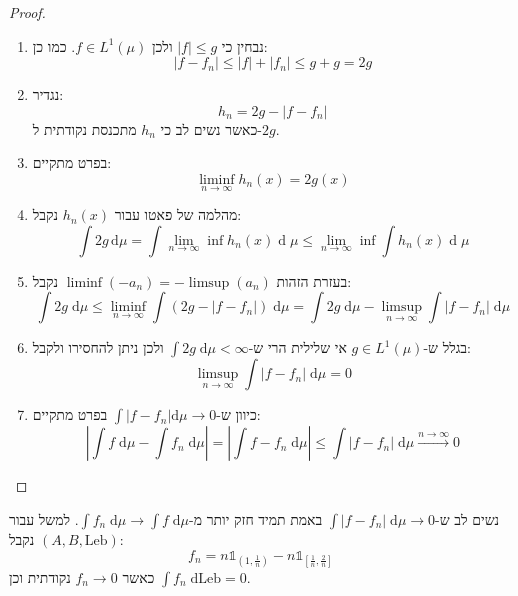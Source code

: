 \documentclass{tstextbook}
\begin{document}
\begin{proof}
  \begin{enumerate}
    \item נבחין כי \(\lvert f \rvert\leq g\) ולכן \(f \in L^{1}\left( \mu \right)\). כמו כן: 
$$\lvert f-f_{n} \rvert \leq \lvert f \rvert +\lvert f_{n} \rvert \leq g+g = 2g$$


    \item נגדיר: 
$$h_{n}=2g-\lvert f-f_{n} \rvert $$
כאשר נשים לב כי \(h_{n}\) מתכנסת נקודתית ל-\(2g\).


    \item בפרט מתקיים: 
$$\liminf_{ n \to \infty } h_{n}(x)=2g(x) $$


    \item מהלמה של פאטו עבור \(h_{n}(x)\) נקבל: 
$$\int2g\,\mathrm{d}\mu=\int\operatorname*{lim}_{n\to\infty}\operatorname*{inf}h_{n}(x)\operatorname{d}\!\mu\leq\operatorname*{lim}_{n\to\infty}\operatorname*{inf}\int h_{n}(x)\operatorname{d}\!\mu$$


    \item בעזרת הזהות \(\liminf(-a_{n})=-\limsup(a_{n})\) נקבל: 
$$\int 2g \;\mathrm{d} \mu \leq \liminf_{ n \to \infty }  \int\left( 2g-\lvert f-f_{n} \rvert  \right)\;\mathrm{d}\mu=\int 2g \;\mathrm{d} \mu - \limsup_{ n \to \infty }  \int \lvert f-f_{n} \rvert  \;\mathrm{d} \mu $$


    \item בגלל ש-\(g \in L^{1}\left( \mu \right)\) אי שלילית הרי ש-\(\int 2g \;\mathrm{d} \mu< \infty\) ולכן ניתן להחסירו ולקבל: 
$$\limsup_{ n \to \infty }\int \lvert f-f_{n} \rvert  \;\mathrm{d} \mu =0  $$


    \item כיוון ש-\(\int\lvert f-f_{n} \rvert\mathrm{d}\mu\to 0\) בפרט מתקיים: 
$$\left\lvert  \int f \;\mathrm{d} \mu -\int f_{n} \;\mathrm{d} \mu   \right\rvert =\left\lvert  \int f-f_{n} \;\mathrm{d} \mu   \right\rvert \leq \int \lvert f-f_{n} \rvert  \;\mathrm{d} \mu \xrightarrow{n\to \infty} 0 $$


  \end{enumerate}
\end{proof}
\begin{remark}
נשים לב ש-\(\int \lvert f-f_{n} \rvert \;\mathrm{d} \mu\to 0\) באמת תמיד חזק יותר מ-\(\int f_{n} \;\mathrm{d} \mu\to \int f \;\mathrm{d} \mu\). למשל עבור \(\left( A,B,\text{Leb} \right)\) נקבל:
$$f_{n}=n\mathbb{1} _{\left( 1,\frac{1}{n} \right)}-n\mathbb{1} _{\left[ \frac{1}{n},\frac{2}{n} \right]}$$
כאשר \(f_{n}\to 0\) נקודתית וכן \(\int f_{n} \;\mathrm{d} \text{Leb}=0\).

\end{remark}
\end{document}

